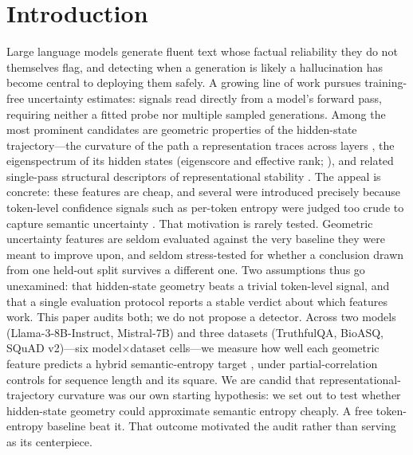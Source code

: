 \documentclass[11pt]{article}
\begin{document}
\section{Introduction}
Large language models generate fluent text whose factual reliability they do not themselves flag, and detecting when a generation is likely a hallucination has become central to deploying them safely. A growing line of work pursues training-free uncertainty estimates: signals read directly from a model's forward pass, requiring neither a fitted probe nor multiple sampled generations. Among the most prominent candidates are geometric properties of the hidden-state trajectory---the curvature of the path a representation traces across layers \citep{king2026representational,damirchi2026truth}, the eigenspectrum of its hidden states (eigenscore and effective rank; \citealp{chen2024inside,wang2025revisiting}), and related single-pass structural descriptors of representational stability \citep{yang2026trust}. The appeal is concrete: these features are cheap, and several were introduced precisely because token-level confidence signals such as per-token entropy were judged too crude to capture semantic uncertainty \citep{kuhn2023semantic,farquhar2024detecting}.
That motivation is rarely tested. Geometric uncertainty features are seldom evaluated against the very baseline they were meant to improve upon, and seldom stress-tested for whether a conclusion drawn from one held-out split survives a different one. Two assumptions thus go unexamined: that hidden-state geometry beats a trivial token-level signal, and that a single evaluation protocol reports a stable verdict about which features work.
This paper audits both; we do not propose a detector. Across two models (Llama-3-8B-Instruct, Mistral-7B) and three datasets (TruthfulQA, BioASQ, SQuAD v2)---six model$\times$dataset cells---we measure how well each geometric feature predicts a hybrid semantic-entropy target \citep{kuhn2023semantic,farquhar2024detecting}, under partial-correlation controls for sequence length and its square. We are candid that representational-trajectory curvature was our own starting hypothesis: we set out to test whether hidden-state geometry could approximate semantic entropy cheaply. A free token-entropy baseline beat it. That outcome motivated the audit rather than serving as its centerpiece.
\end{document}
